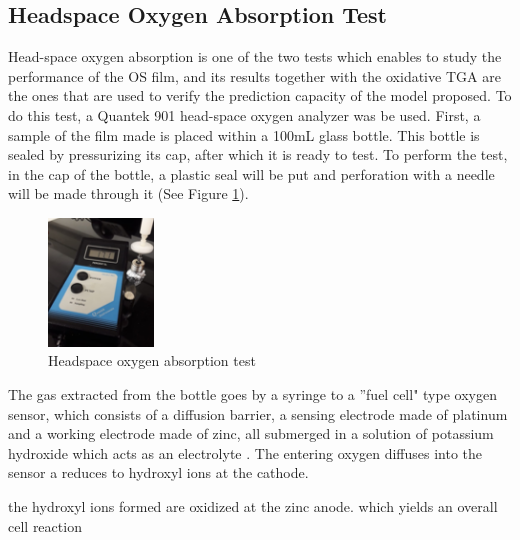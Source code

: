\begin{refsection}
\subsection{Headspace Oxygen Absorption Test}\label{subsec:headspace}
Head-space oxygen absorption is one of the two tests which enables to study the performance of the OS film, and its results together with the oxidative TGA are the ones that are used to verify the prediction capacity of the model proposed. To do this test, a Quantek 901 head-space oxygen analyzer was be used. First, a sample of the film made is placed within a 100mL glass bottle. This bottle is sealed by pressurizing its cap, after which it is ready to test. To perform the test, in the cap of the bottle, a plastic seal will be put and perforation with a needle will be made through it (See Figure \ref{fig:headspace}).

\begin{figure}[ht]
    \centering
    \includegraphics[width=0.25\textwidth]{Imagenes/headspace.png}
    \caption{Headspace oxygen absorption test}
    \label{fig:headspace}
\end{figure}

The gas extracted from the bottle goes by a syringe to a ''fuel cell" type oxygen sensor, which consists of a diffusion barrier, a sensing electrode made of platinum and a working electrode made of zinc, all submerged in a solution of potassium hydroxide which acts as an electrolyte \cite{Boissevain1996CorporateGuide}. The entering oxygen diffuses into the sensor a reduces to hydroxyl ions at the cathode.

the hydroxyl ions formed are oxidized at the zinc anode.
 which yields an overall cell reaction 


\end{refsection}
